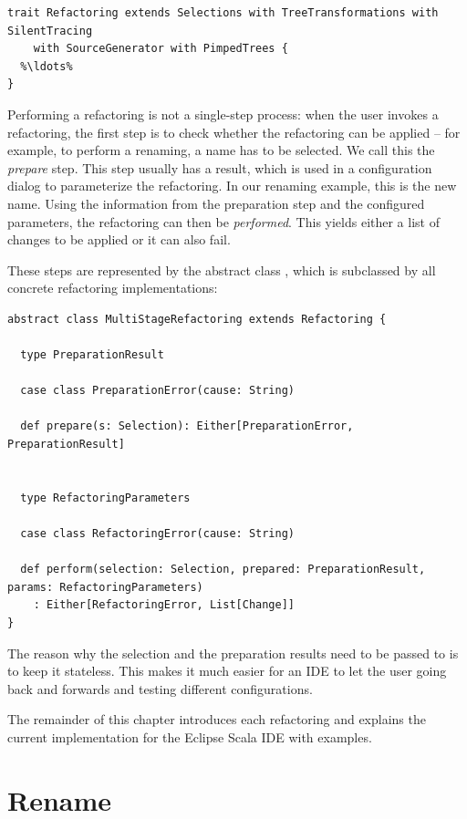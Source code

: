 \documentclass[10pt,a4paper,oneside]{scrreprt}
\begin{document}
\begin{lstlisting}
trait Refactoring extends Selections with TreeTransformations with SilentTracing 
    with SourceGenerator with PimpedTrees {
  %\ldots%
}
\end{lstlisting}

Performing a refactoring is not a single-step process: when the user invokes a refactoring, the first step is to check whether the refactoring can be applied -- for example, to perform a renaming, a name has to be selected. We call this the \textit{prepare} step. This step usually has a result, which is used in a configuration dialog to parameterize the refactoring. In our renaming example, this is the new name. Using the information from the preparation step and the configured parameters, the refactoring can then be \textit{performed}. This yields either a list of changes to be applied or it can also fail.

These steps are represented by the abstract class , which is subclassed by all concrete refactoring implementations:

\begin{lstlisting}
abstract class MultiStageRefactoring extends Refactoring {
  
  type PreparationResult
  
  case class PreparationError(cause: String)

  def prepare(s: Selection): Either[PreparationError, PreparationResult]

  
  type RefactoringParameters
  
  case class RefactoringError(cause: String)
  
  def perform(selection: Selection, prepared: PreparationResult, params: RefactoringParameters)
    : Either[RefactoringError, List[Change]]
}
\end{lstlisting}

The reason why the selection and the preparation results need to be passed to  is to keep it stateless. This makes it much easier for an IDE to let the user going back and forwards and testing different configurations.

The remainder of this chapter introduces each refactoring and explains the current implementation for the Eclipse Scala IDE with examples. 

\section{Rename}
\end{document}
